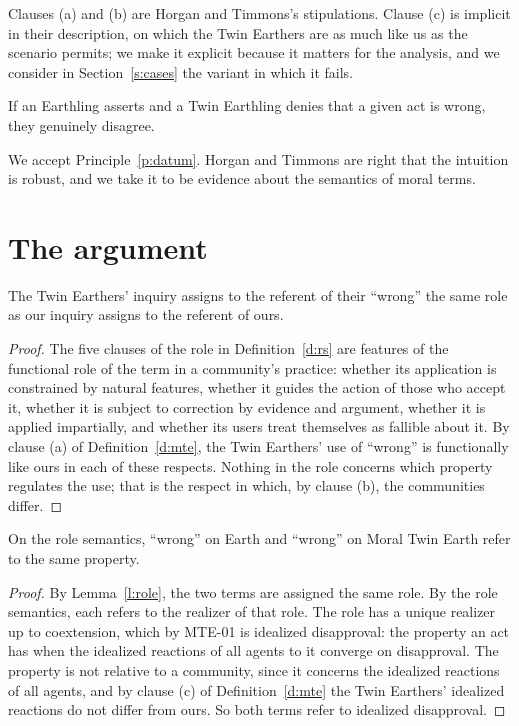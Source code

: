 \documentclass{situationist-preprint}
\begin{document}
Clauses (a) and (b) are Horgan and Timmons's stipulations. Clause (c) is implicit in their description, on which the Twin Earthers are as much like us as the scenario permits; we make it explicit because it matters for the analysis, and we consider in Section~\ref{s:cases} the variant in which it fails.

\begin{principle}\label{p:datum}
If an Earthling asserts and a Twin Earthling denies that a given act is wrong, they genuinely disagree.
\end{principle}

We accept Principle~\ref{p:datum}. Horgan and Timmons are right that the intuition is robust, and we take it to be evidence about the semantics of moral terms.

\section{The argument}

\begin{lemma}\label{l:role}
The Twin Earthers' inquiry assigns to the referent of their \enquote{wrong} the same role as our inquiry assigns to the referent of ours.
\end{lemma}

\begin{proof}
The five clauses of the role in Definition~\ref{d:rs} are features of the functional role of the term in a community's practice: whether its application is constrained by natural features, whether it guides the action of those who accept it, whether it is subject to correction by evidence and argument, whether it is applied impartially, and whether its users treat themselves as fallible about it. By clause (a) of Definition~\ref{d:mte}, the Twin Earthers' use of \enquote{wrong} is functionally like ours in each of these respects. Nothing in the role concerns which property regulates the use; that is the respect in which, by clause (b), the communities differ.
\end{proof}

\begin{theorem}\label{t:same}
On the role semantics, \enquote{wrong} on Earth and \enquote{wrong} on Moral Twin Earth refer to the same property.
\end{theorem}

\begin{proof}
By Lemma~\ref{l:role}, the two terms are assigned the same role. By the role semantics, each refers to the realizer of that role. The role has a unique realizer up to coextension, which by MTE-01 is idealized disapproval: the property an act has when the idealized reactions of all agents to it converge on disapproval. The property is not relative to a community, since it concerns the idealized reactions of all agents, and by clause (c) of Definition~\ref{d:mte} the Twin Earthers' idealized reactions do not differ from ours. So both terms refer to idealized disapproval.
\end{proof}
\end{document}
